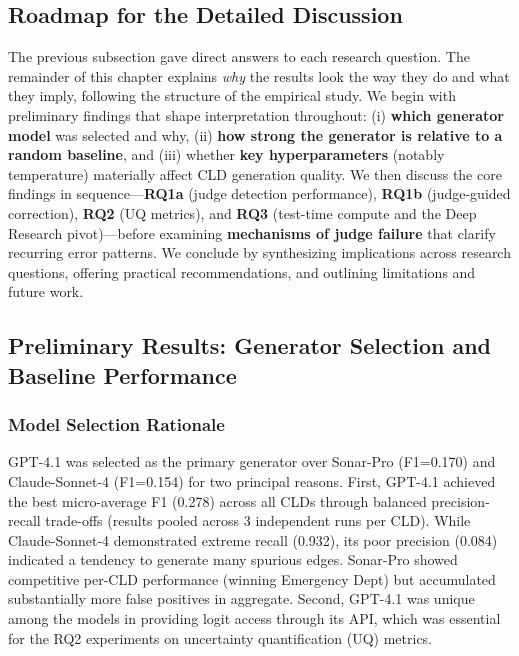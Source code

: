 \subsection{Roadmap for the Detailed Discussion}
\label{sec:discussion_positioning_preliminaries}
The previous subsection gave direct answers to each research question. The remainder of this chapter explains \textit{why} the results look the way they do and what they imply, following the structure of the empirical study. We begin with preliminary findings that shape interpretation throughout: (i) \textbf{which generator model} was selected and why, (ii) \textbf{how strong the generator is relative to a random baseline}, and (iii) whether \textbf{key hyperparameters} (notably temperature) materially affect CLD generation quality. We then discuss the core findings in sequence---\textbf{RQ1a} (judge detection performance), \textbf{RQ1b} (judge-guided correction), \textbf{RQ2} (UQ metrics), and \textbf{RQ3} (test-time compute and the Deep Research pivot)---before examining \textbf{mechanisms of judge failure} that clarify recurring error patterns. We conclude by synthesizing implications across research questions, offering practical recommendations, and outlining limitations and future work.

\subsection{Preliminary Results: Generator Selection and Baseline Performance}
\label{sec:discussion_preliminaries}

\subsubsection{Model Selection Rationale}

GPT-4.1 was selected as the primary generator over Sonar-Pro (F1=0.170) and Claude-Sonnet-4 (F1=0.154) for two principal reasons. First, GPT-4.1 achieved the best micro-average F1 (0.278) across all CLDs through balanced precision-recall trade-offs (results pooled across 3 independent runs per CLD). While Claude-Sonnet-4 demonstrated extreme recall (0.932), its poor precision (0.084) indicated a tendency to generate many spurious edges. Sonar-Pro showed competitive per-CLD performance (winning Emergency Dept) but accumulated substantially more false positives in aggregate. Second, GPT-4.1 was unique among the models in providing logit access through its API, which was essential for the RQ2 experiments on uncertainty quantification (UQ) metrics.

